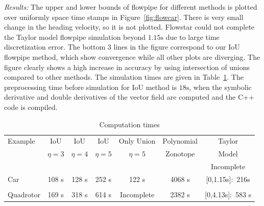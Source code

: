 
\emph{Results:}  The upper and lower bounds of flowpipe for different
  methods is plotted over uniformly space time stamps in
  Figure~\ref{fig:flowcar}.  There is very small change in the heading
  velocity, so it is not plotted.  Flowstar could not complete the
  Taylor model flowpipe simulation beyond $1.15\si{\second}$ due to
  large time discretization error.  The bottom 3 lines in the figure
  correspond to our IoU flowpipe method, which show convergence while
  all other plots are diverging.  The figure clearly shows a high
  increase in accuracy by using intersection of unions compared to
  other methods.  The simulation times are given in
  Table~\ref{tab:comptimes}.  The preprocessing time before simulation
  for IoU method is $18\si{\second}$, when the symbolic
  derivative and double derivatives of the vector field are computed and the C++ code is
  compiled.
\begin{table}
\begin{center}
\caption{Computation times}\label{tab:comptimes}
\begin{tabular}{|l|c|c|c|c|c|c|}
\hline
Example & IoU  & IoU  & IoU  & Only Union &
Polynomial & Taylor\\
& $\eta = 3$ & $\eta = 4$ & $\eta = 5$ & $\eta = 5$ & Zonotope & Model \\
\hline
& & & & & & {\color{red}Incomplete}\\
Car & 108 s & 128 s & 252 s & 122 s & 4068 s & {\color{red}[0,1.15s]:~216s}\\
\hline
& & & & & &\\
Quadrotor & 169 s & 318 s & 614 s & {\color{red}
Incomplete} & 2382 s & {\color{red}[0,4.13s]:~583 s} \\
\hline
\end{tabular}
\end{center}
\end{table}

